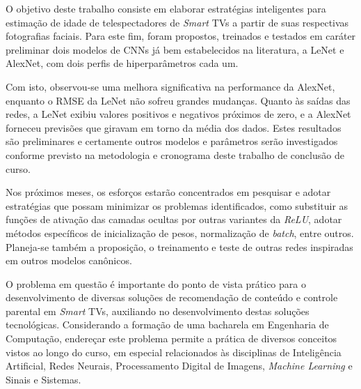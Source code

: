 O objetivo deste trabalho consiste em elaborar estratégias inteligentes para estimação de idade de telespectadores de  \emph{Smart} TVs a partir de suas respectivas fotografias faciais. Para este fim, foram propostos, treinados e testados em caráter preliminar dois modelos de CNNs já bem estabelecidos na literatura, a LeNet e AlexNet, com dois perfis de hiperparâmetros cada um.

Com isto, observou-se uma melhora significativa na performance da AlexNet, enquanto o RMSE da LeNet não sofreu grandes mudanças. Quanto às saídas das redes, a LeNet exibiu valores positivos e negativos próximos de zero, e a AlexNet forneceu previsões que giravam em torno da média dos dados. Estes resultados são preliminares e certamente outros modelos e parâmetros serão investigados conforme previsto na metodologia e cronograma deste trabalho de conclusão de curso.

Nos próximos meses, os esforços estarão concentrados em pesquisar e adotar estratégias que possam minimizar os problemas identificados, como substituir as funções de ativação das camadas ocultas por outras variantes da \emph{ReLU}, adotar métodos específicos de inicialização de pesos, normalização de \emph{batch}, entre outros. Planeja-se também a proposição, o treinamento e teste de outras redes inspiradas em outros modelos canônicos.

O problema em questão é importante do ponto de vista prático para o desenvolvimento de diversas soluções de recomendação de conteúdo e controle parental em \emph{Smart} TVs, auxiliando no desenvolvimento destas soluções tecnológicas. Considerando a formação de uma bacharela em Engenharia de Computação, endereçar este problema permite a prática de diversos conceitos vistos ao longo do curso, em especial relacionados às disciplinas de Inteligência Artificial, Redes Neurais, Processamento Digital de Imagens, \emph{Machine Learning} e Sinais e Sistemas.
